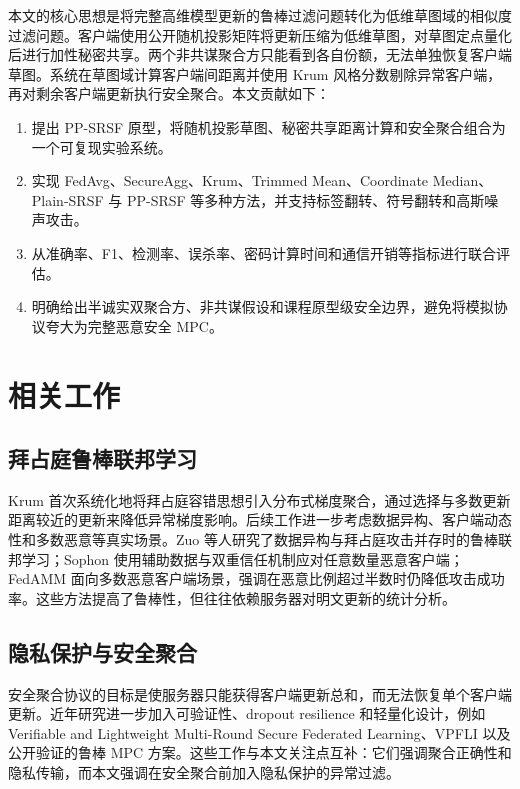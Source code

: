 \documentclass[UTF8,a4paper,zihao=-4]{ctexart}
\begin{document}
本文的核心思想是将完整高维模型更新的鲁棒过滤问题转化为低维草图域的相似度过滤问题。客户端使用公开随机投影矩阵将更新压缩为低维草图，对草图定点量化后进行加性秘密共享。两个非共谋聚合方只能看到各自份额，无法单独恢复客户端草图。系统在草图域计算客户端间距离并使用 Krum 风格分数剔除异常客户端，再对剩余客户端更新执行安全聚合。本文贡献如下：
\begin{enumerate}
  \item 提出 PP-SRSF 原型，将随机投影草图、秘密共享距离计算和安全聚合组合为一个可复现实验系统。
  \item 实现 FedAvg、SecureAgg、Krum、Trimmed Mean、Coordinate Median、Plain-SRSF 与 PP-SRSF 等多种方法，并支持标签翻转、符号翻转和高斯噪声攻击。
  \item 从准确率、F1、检测率、误杀率、密码计算时间和通信开销等指标进行联合评估。
  \item 明确给出半诚实双聚合方、非共谋假设和课程原型级安全边界，避免将模拟协议夸大为完整恶意安全 MPC。
\end{enumerate}

\section{相关工作}
\subsection{拜占庭鲁棒联邦学习}
Krum 首次系统化地将拜占庭容错思想引入分布式梯度聚合，通过选择与多数更新距离较近的更新来降低异常梯度影响\cite{blanchard2017krum}。后续工作进一步考虑数据异构、客户端动态性和多数恶意等真实场景。Zuo 等人研究了数据异构与拜占庭攻击并存时的鲁棒联邦学习\cite{zuo2025heterogeneity}；Sophon 使用辅助数据与双重信任机制应对任意数量恶意客户端\cite{sophon2025}；FedAMM 面向多数恶意客户端场景，强调在恶意比例超过半数时仍降低攻击成功率\cite{fedamm2025}。这些方法提高了鲁棒性，但往往依赖服务器对明文更新的统计分析。

\subsection{隐私保护与安全聚合}
安全聚合协议的目标是使服务器只能获得客户端更新总和，而无法恢复单个客户端更新\cite{bonawitz2017secagg}。近年研究进一步加入可验证性、dropout resilience 和轻量化设计，例如 Verifiable and Lightweight Multi-Round Secure Federated Learning\cite{li2026verifiable}、VPFLI\cite{ren2025vpfli} 以及公开验证的鲁棒 MPC 方案\cite{gai2025public}。这些工作与本文关注点互补：它们强调聚合正确性和隐私传输，而本文强调在安全聚合前加入隐私保护的异常过滤。
\end{document}
